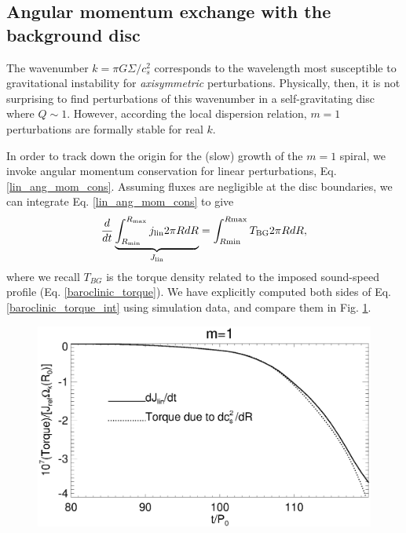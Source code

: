 \subsection{Angular momentum exchange with the background disc} 
The wavenumber $k = \pi G\Sigma/c_s^2$ corresponds to the
wavelength most susceptible to gravitational instability for
\emph{axisymmetric} perturbations. Physically, then, it is not
surprising to find perturbations of this wavenumber in a
self-gravitating disc where $Q\sim 1$. However, according the
local dispersion relation, $m=1$ perturbations are formally stable for 
real $k$.  

In order to track down the origin for the (slow) growth of the
$m=1$ spiral, we invoke angular momentum conservation for linear
perturbations, Eq. \ref{lin_ang_mom_cons}. Assuming fluxes are
negligible at the disc boundaries, we can integrate
Eq. \ref{lin_ang_mom_cons} to give
\begin{align}\label{baroclinic_torque_int}
  \frac{d}{dt}\underbrace{\int_{R_\mathrm{min}}^{R_\mathrm{max}}j_\mathrm{lin}
    2\pi R dR}_{J_\mathrm{lin}} 
  =\int_{R\mathrm{min}}^{R\mathrm{max}}T_\mathrm{BG} 2\pi R dR, 
\end{align}
where we recall $T_{BG}$ is the torque density related to the imposed
sound-speed profile (Eq. \ref{baroclinic_torque}). We have explicitly
computed both sides of Eq. \ref{baroclinic_torque_int} using
simulation data, and compare them in Fig. \ref{fargo_angmom_ex}.  



\begin{figure}
  \includegraphics[width=\linewidth]{figures/m1_analysis_ang_fargo.ps} 
  \caption{
    \label{fargo_angmom_ex}} 
\end{figure}

